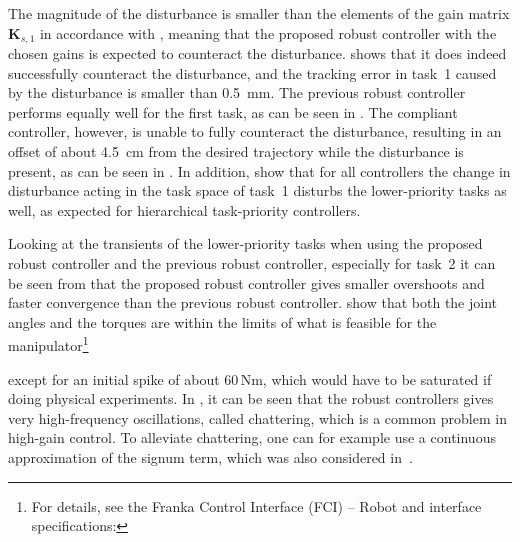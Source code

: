 \documentclass[../main.tex]{subfiles}
\begin{document}
The magnitude of the disturbance is smaller than the elements of the gain matrix $\bm{K}_{s,1}$ in accordance with , meaning that the proposed robust controller with the chosen gains is expected to counteract the disturbance.  shows that it does indeed successfully counteract the disturbance, and the tracking error in task~1 caused by the disturbance is smaller than \qty{0.5}{\milli\meter}. The previous robust controller performs equally well for the first task, as can be seen in . The compliant controller, however, is unable to fully counteract the disturbance, resulting in an offset of about \qty{4.5}{\centi\meter} from the desired trajectory while the disturbance is present, as can be seen in . In addition,  show that for all controllers the change in disturbance acting in the task space of task~1 disturbs the lower-priority tasks as well, as expected for hierarchical task-priority controllers.

Looking at the transients of the lower-priority tasks  when using the proposed robust controller and the previous robust controller, especially for task~2 it can be seen from  that the proposed robust controller gives smaller overshoots and faster convergence than the previous robust controller.  show that both the joint angles and the torques are within the limits of what is feasible for the manipulator\footnote{For details, see the Franka Control Interface (FCI) -- Robot and interface specifications: }


except for an initial spike of about $60\,$Nm, which would have to be saturated if doing physical experiments. In , it can be seen that the robust controllers gives very high-frequency oscillations, called chattering, which is a common problem in high-gain control. To alleviate chattering, one can for example use a continuous approximation of the signum term, which was also considered in~\cite{DyrhaugTveter2023}.

\end{document}
